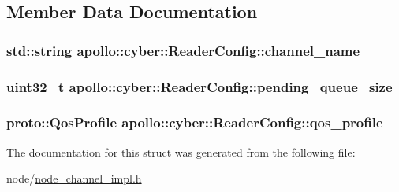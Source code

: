 \subsection{Member Data Documentation}
\hypertarget{structapollo_1_1cyber_1_1ReaderConfig_aaffc3b9efdd953a4fad71e9709a1e79b}{
\subsubsection[{channel\-\_\-name}]{\setlength{\rightskip}{0pt plus 5cm}std\-::string apollo\-::cyber\-::\-Reader\-Config\-::channel\-\_\-name}}\label{structapollo_1_1cyber_1_1ReaderConfig_aaffc3b9efdd953a4fad71e9709a1e79b}
\hypertarget{structapollo_1_1cyber_1_1ReaderConfig_affa7656a5714023523d0f9202d0d0f2b}{
\subsubsection[{pending\-\_\-queue\-\_\-size}]{\setlength{\rightskip}{0pt plus 5cm}uint32\-\_\-t apollo\-::cyber\-::\-Reader\-Config\-::pending\-\_\-queue\-\_\-size}}\label{structapollo_1_1cyber_1_1ReaderConfig_affa7656a5714023523d0f9202d0d0f2b}
\hypertarget{structapollo_1_1cyber_1_1ReaderConfig_a8cf1a58770f0b0abef6a2f3d33b2778c}{
\subsubsection[{qos\-\_\-profile}]{\setlength{\rightskip}{0pt plus 5cm}proto\-::\-Qos\-Profile apollo\-::cyber\-::\-Reader\-Config\-::qos\-\_\-profile}}\label{structapollo_1_1cyber_1_1ReaderConfig_a8cf1a58770f0b0abef6a2f3d33b2778c}


The documentation for this struct was generated from the following file\-:\begin{DoxyCompactItemize}
\item 
node/\hyperlink{node__channel__impl_8h}{node\-\_\-channel\-\_\-impl.\-h}\end{DoxyCompactItemize}
